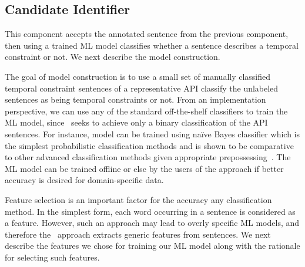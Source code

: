 \subsection{Candidate Identifier}

This component accepts the annotated sentence from the previous component,
then using a trained ML model classifies whether a sentence describes a temporal constraint or not. We next describe the model construction.

The goal of model construction is to use a small set of manually classified temporal constraint sentences of a representative API classify the unlabeled sentences as being temporal constraints or not.
From an implementation perspective, we can use any of the standard off-the-shelf classifiers to train the ML model, since \tool\ seeks to achieve only a binary classification of the API sentences.
For instance, model can be trained using na{\"i}ve Bayes classifier which is the simplest probabilistic classification methods and is shown to be comparative to other advanced classification methods given appropriate prepossessing~\cite{rennie2003tackling}.
The ML model can be trained offline or else by the users of the approach if better accuracy is desired for domain-specific data.

Feature selection is an important factor for the accuracy any classification method.
In the simplest form, each word occurring in a sentence is considered as a feature. However, such an approach may lead to overly specific ML models, and therefore the \tool\ approach extracts generic features from sentences. We next describe the features we chose for training our ML model along with the rationale for selecting such features.

